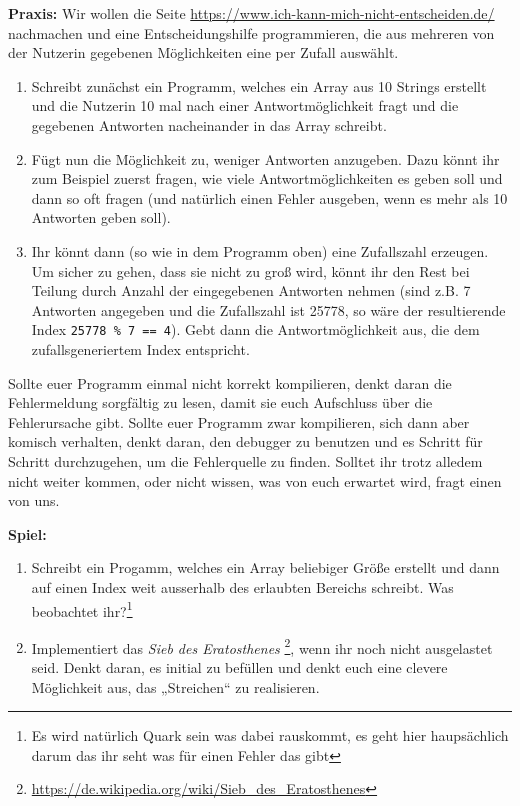 \textbf{Praxis:}
Wir wollen die Seite \url{https://www.ich-kann-mich-nicht-entscheiden.de/}
nachmachen und eine Entscheidungshilfe programmieren, die aus mehreren von der
Nutzerin gegebenen Möglichkeiten eine per Zufall auswählt.

\begin{enumerate}
	\item Schreibt zunächst ein Programm, welches ein Array aus 10 Strings
	      erstellt und die Nutzerin 10 mal nach einer Antwortmöglichkeit fragt
	      und die gegebenen Antworten nacheinander in das Array schreibt.
	\item Fügt nun die Möglichkeit zu, weniger Antworten anzugeben. Dazu könnt
	      ihr zum Beispiel zuerst fragen, wie viele Antwortmöglichkeiten es geben
	      soll und dann so oft fragen (und natürlich einen Fehler ausgeben, wenn
	      es mehr als 10 Antworten geben soll).
	\item Ihr könnt dann (so wie in dem Programm oben) eine Zufallszahl
	      erzeugen. Um sicher zu gehen, dass sie nicht zu groß wird, könnt ihr
	      den Rest bei Teilung durch Anzahl der eingegebenen Antworten nehmen
	      (sind z.B. 7 Antworten angegeben und die Zufallszahl ist 25778, so wäre
	      der resultierende Index \texttt{25778 \% 7 == 4}). Gebt dann die
	      Antwortmöglichkeit aus, die dem zufallsgeneriertem Index
	      entspricht.
\end{enumerate}

Sollte euer Programm einmal nicht korrekt kompilieren, denkt daran die
Fehlermeldung sorgfältig zu lesen, damit sie euch Aufschluss über die
Fehlerursache gibt. Sollte euer Programm zwar kompilieren, sich dann aber
komisch verhalten, denkt daran, den debugger zu benutzen und es Schritt für
Schritt durchzugehen, um die Fehlerquelle zu finden. Solltet ihr trotz alledem
nicht weiter kommen, oder nicht wissen, was von euch erwartet wird, fragt einen
von uns.

\textbf{Spiel:}
\begin{enumerate}
	\item Schreibt ein Progamm, welches ein Array beliebiger Größe erstellt und
	      dann auf einen Index weit ausserhalb des erlaubten Bereichs schreibt.
	      Was beobachtet ihr?\footnote{Es wird natürlich Quark sein was dabei
		      rauskommt, es geht hier haupsächlich darum das ihr seht was für
		      einen Fehler das gibt}
	\item Implementiert das \emph{Sieb des Eratosthenes}
	      \footnote{\url{https://de.wikipedia.org/wiki/Sieb_des_Eratosthenes}},
	      wenn ihr noch nicht ausgelastet seid.
	      Denkt daran, es initial zu befüllen und denkt euch eine clevere
	      Möglichkeit aus, das „Streichen“ zu realisieren.
\end{enumerate}


